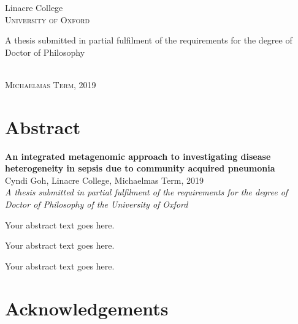 \begin{titlepage}
\begin{center}
{\Large Linacre College}\\
\vspace{4mm}
{\large\textsc{University of Oxford}}\\
\vspace{10mm}

\begin{minipage}{10cm}
\begin{center}
{\large A thesis submitted in partial fulfilment of the requirements for the degree of Doctor of Philosophy}
\end{center}
\end{minipage}\\

\vspace{9mm}
{\large\textsc{Michaelmas Term, 2019}}
\vspace{12mm}

\end{center}
\end{titlepage}

\newpage

\chapter*{Abstract} %
\thispagestyle{plain}
 \setcounter{page}{1}
\onehalfspacing
\vspace*{0.4cm}
\begin{center}
{\large\bf An integrated metagenomic approach to investigating disease heterogeneity in sepsis due to community acquired pneumonia} \\
{Cyndi Goh, Linacre College, Michaelmas Term, 2019}\\
\vspace*{0.4cm}
{\itshape A thesis submitted in partial fulfilment of the requirements
for the degree of Doctor of Philosophy of the University of Oxford} \\
\vspace*{0.4cm}
\end{center}

\singlespacing

Your abstract text goes here.

Your abstract text goes here.

Your abstract text goes here.

\newpage
\chapter*{Acknowledgements}
\thispagestyle{plain}
\noindent
\singlespacing

